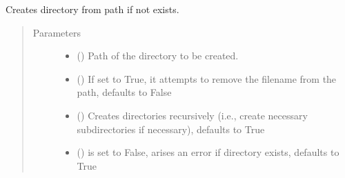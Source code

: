 \documentclass[letterpaper,10pt,english]{sphinxmanual}
\begin{document}
\begin{fulllineitems}
\label{\detokenize{code:code_utils.utils.makedir}}
Creates directory from path if not exists.
\begin{quote}\begin{description}
\item[{Parameters}] \leavevmode\begin{itemize}
\item {} 
 () \textendash{} Path of the directory to be created.

\item {} 
 (\sphinxstyleliteralemphasis{\sphinxupquote{, }}) \textendash{} If set to True, it attempts to remove the filename from
the path, defaults to False

\item {} 
 (\sphinxstyleliteralemphasis{\sphinxupquote{, }}) \textendash{} Creates directories recursively (i.e., create necessary 
subdirectories if necessary), defaults to True

\item {} 
 (\sphinxstyleliteralemphasis{\sphinxupquote{, }}) \textendash{} is set to False, arises an error if  directory exists,
defaults to True

\end{itemize}

\end{description}\end{quote}

\end{fulllineitems}
\end{document}
